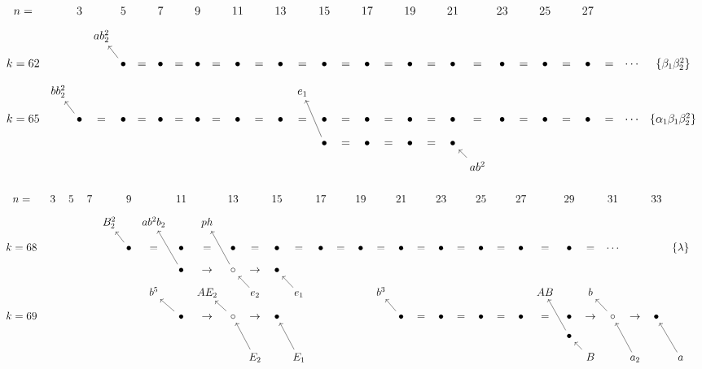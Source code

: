 \documentclass{article}
\begin{document}
\(
\begin{tikzcd}[
nodes={font=\large},
row sep=0.3cm,
column sep=0.1cm]
n= && 3 && 5 && 7 && 9 && 11 && 13 && 15 && 17 && 19 && 21 && 23 && 25 && 27 \\
 & && ab_2^2 && &&  \\
k=62 && && \bullet\arrow[lu] &=& \bullet &=& \bullet & = & \bullet & = & \bullet & = & \bullet & = & \bullet & = & \bullet  &=& \bullet &=& \bullet &=& \bullet &=& \bullet &=& \cdots & \{\beta_1\beta_2^2\} \\
& bb_2^2 && && && && && && e_1 \\
k=65 && \bullet \arrow[lu] &=& \bullet  &=& \bullet &=& \bullet &=& \bullet &=& \bullet &=& \bullet &=& \bullet &=& \bullet &=& \bullet &=& \bullet &=& \bullet &=& \bullet &=& \cdots & \{\alpha_1\beta_1\beta_2^2\} \\
&& && && && && && && \bullet\arrow[luu] &=& \bullet &=& \bullet &=& \bullet \\
& && && && && && && && && && && ab^2\arrow[lu] \\
\\
\end{tikzcd}
\) \\
\(
\begin{tikzcd}[
nodes={font=\large},
row sep=0.3cm,
column sep=0.1cm]
n= && 3 && 5 && 7 && 9 && 11 && 13 && 15 && 17 && 19 && 21 && 23 && 25 && 27 && 29 && 31 && 33\\
& && && && B_2^2 && ab^2b_2 && ph \\
k=68 && && && && \bullet \arrow[lu] &=& \bullet &=& \bullet &=& \bullet &=& \bullet &=& \bullet &=& \bullet &=& \bullet &=& \bullet &=& \bullet &=& \bullet &=& \cdots &&& \{\lambda\} \\
&& && && && && \bullet \arrow[luu] & \rightarrow & \circ\arrow[luu] & \rightarrow & \bullet \\
& && && && && b^5 && AE_2 && e_2\arrow[lu] && e_1\arrow[lu] && && b^3 && && && && AB && b \\
k=69 && && && && && \bullet \arrow[lu] & \rightarrow & \circ\arrow[lu] & \rightarrow & \bullet && && && \bullet\arrow[lu] &=& \bullet &=& \bullet &=& \bullet &=& \bullet & \rightarrow & \circ\arrow[lu] & \rightarrow & \bullet \\
&& && && && && && && && && && && && && && \bullet\arrow[luu] && && && &&  \\
& && && && && && && E_2\arrow[luu] && E_1\arrow[luu] && && && && && && && B\arrow[lu] && a_2\arrow[luu] && a\arrow[luu] 
\\
\end{tikzcd}
\)
\end{document}
